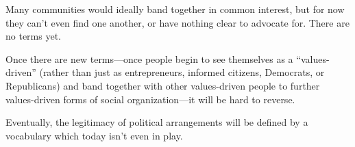 \begin{small}
Many communities would ideally band together in common interest, but for now they can't even find one another, or have nothing clear to advocate for. There are no terms yet.

Once there are new terms—once people begin to see themselves as a ``values-driven'' (rather than just as entrepreneurs, informed citizens, Democrats, or Republicans) and band together with other values-driven people to further values-driven forms of social organization—it will be hard to reverse.

Eventually, the legitimacy of political arrangements will be defined by a vocabulary which today isn't even in play.
\end{small}